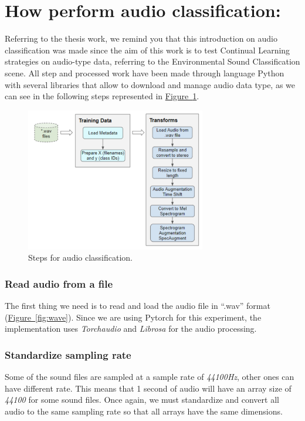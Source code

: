 \documentclass[english, LaM, oneside]{sapthesis}%
\begin{document}
\section{How perform audio classification:}
\label{5-3}
Referring to the thesis work, we remind you that this introduction on audio classification was made since the aim of this work is to test Continual Learning strategies on audio-type data, referring to the Environmental Sound Classification scene.
All step and processed work  have been made through language Python with several libraries that allow to download and manage audio data type, as we can see in the following steps represented in \hyperref[fig:audio_step]{Figure~\ref*{fig:audio_step}}.

\begin{figure}[h]
            \centering
            \includegraphics[width=0.70\textwidth]{audio_step.png}
            \caption{Steps for audio classification.}
            \label{fig:audio_step}
\end{figure}


\subsubsection{Read audio from a file}
The first thing we need is to read and load the audio file in “.wav” format (\hyperref[fig:wave]{Figure~\ref*{fig:wave}}). Since we are using Pytorch \cite{pytorch} for this experiment, the implementation uses \textit{Torchaudio} \cite{torchaudio} and \textit{Librosa} \cite{librosa} for the audio processing.


\subsubsection{Standardize sampling rate}
Some of the sound files are sampled at a sample rate of \textit{44100Hz}, other ones can have different rate. This means that 1 second of audio will have an array size of \textit{44100} for some sound files. Once again, we must standardize and convert all audio to the same sampling rate so that all arrays have the same dimensions.
\end{document}
